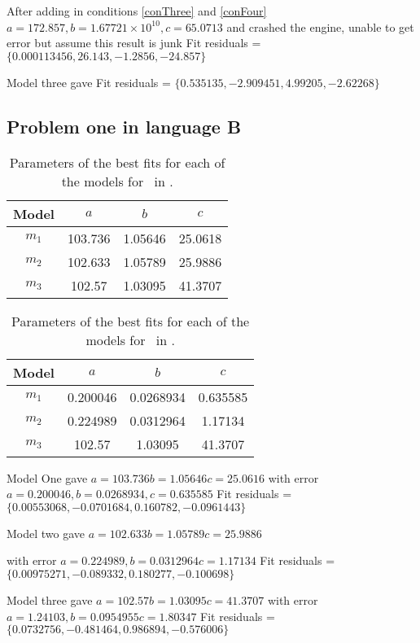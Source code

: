 After adding in conditions \ref{conThree} and \ref{conFour}
$a = 172.857, b = 1.67721 \times 10^10, c = 65.0713$ and crashed the engine,
  unable to get error but assume this result is junk
Fit residuals = $\{0.000113456, 26.143, -1.2856, -24.857\}$

Model three gave
Fit residuals = $\{0.535135, -2.909451, 4.99205, -2.62268\}$

\subsection{Problem one in language B} \label{subsecP1LB}

\begin{table}
\centering
\begin{tabular}{|c|c|c|c|}
\hline
{\bf Model} &  $a$ & $b$ & $c$ \\
\hline
$m_1$ & 103.736 & 1.05646 & 25.0618 \\
\hline
$m_2$ & 102.633 & 1.05789 & 25.9886\\
\hline
$m_3$ & 102.57 & 1.03095 & 41.3707 \\
\hline
\end{tabular}
\caption{Parameters of the best fits for each of the models for \PO\ in \LB.}
\label{table:P1LB:abc}
\end{table}

\begin{table}
\centering
\begin{tabular}{|c|c|c|c|}
\hline
{\bf Model} &  $a$ & $b$ & $c$ \\
\hline
$m_1$ & 0.200046 & 0.0268934 & 0.635585 \\
\hline
$m_2$ & 0.224989 & 0.0312964 & 1.17134\\
\hline
$m_3$ & 102.57 & 1.03095 & 41.3707 \\
\hline
\end{tabular}
\caption{Parameters of the best fits for each of the models for \PO\ in \LB.}
\label{table:P1LB:abc:error}
\end{table}

Model One gave
$a = 103.736 b = 1.05646 c = 25.0616$
with error $a = 0.200046, b = 0.0268934, c = 0.635585$
Fit residuals = $\{0.00553068, -0.0701684, 0.160782, -0.0961443\}$

Model two gave
$a = 102.633 b = 1.05789 c = 25.9886$

with error $a = 0.224989, b = 0.0312964 c = 1.17134$
Fit residuals = $\{0.00975271, -0.089332, 0.180277, -0.100698\}$

Model three gave
$a = 102.57 b = 1.03095 c = 41.3707$ with error
$a = 1.24103, b = 0.0954955 c = 1.80347$
Fit residuals = $\{0.0732756, -0.481464, 0.986894, -0.576006\}$

